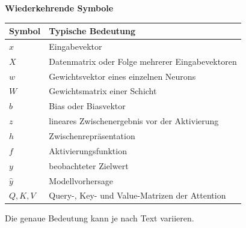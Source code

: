 \begin{frame}[t]
\par\medskip\noindent\textbf{Wiederkehrende Symbole}\par


\par\addvspace{\medskipamount}
\noindent\begin{tabularx}{\linewidth}{@{}>{\raggedright\arraybackslash}p{}>{\raggedright\arraybackslash}X@{}}
\toprule
Symbol & Typische Bedeutung \\
\midrule
$x$ & Eingabevektor \\
$X$ & Datenmatrix oder Folge mehrerer Eingabevektoren \\
$w$ & Gewichtsvektor eines einzelnen Neurons \\
$W$ & Gewichtsmatrix einer Schicht \\
$b$ & Bias oder Biasvektor \\
$z$ & lineares Zwischenergebnis vor der Aktivierung \\
$h$ & Zwischenrepräsentation \\
$f$ & Aktivierungsfunktion \\
$y$ & beobachteter Zielwert \\
$\hat{y}$ & Modellvorhersage \\
$Q,K,V$ & Query-, Key- und Value-Matrizen der Attention \\
\bottomrule
\end{tabularx}
\par\addvspace{\medskipamount}

Die genaue Bedeutung kann je nach Text variieren.
\end{frame}

